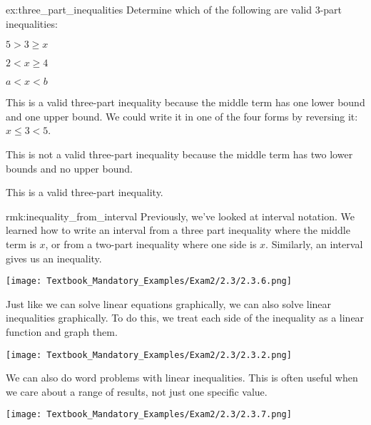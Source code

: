 \documentclass{article}
\begin{document}
\begin{example}{}{ex:three_part_inequalities}
    Determine which of the following are valid 3-part inequalities:
    \begin{problem}
        \item $5 > 3 \geq x$
        \item $2 < x \geq 4$
        \item $a < x < b$
    \end{problem}
\end{example}
\begin{solution}
    \begin{problem}
        \item This is a valid three-part inequality because the middle term has one lower bound and one upper bound. We could write it in one of the four forms by reversing it: $x\leq 3 < 5$.
        \item This is not a valid three-part inequality because the middle term has two lower bounds and no upper bound.
        \item This is a valid three-part inequality.
    \end{problem}
\end{solution}

\begin{remark}{}{rmk:inequality_from_interval}
    Previously, we've looked at interval notation. We learned how to write an interval from a three part inequality where the middle term is $x$, or from a two-part inequality where one side is $x$. Similarly, an interval gives us an inequality.
\end{remark}

\texttt{[image: Textbook\_Mandatory\_Examples/Exam2/2.3/2.3.6.png]}

Just like we can solve linear equations graphically, we can also solve linear inequalities graphically. To do this, we treat each side of the inequality as a linear function and graph them.

\texttt{[image: Textbook\_Mandatory\_Examples/Exam2/2.3/2.3.2.png]}

We can also do word problems with linear inequalities. This is often useful when we care about a range of results, not just one specific value.

\texttt{[image: Textbook\_Mandatory\_Examples/Exam2/2.3/2.3.7.png]}

\setcounter{section}{2}
\setcounter{subsection}{3}
\setcounter{subsubsection}{4}
\end{document}
